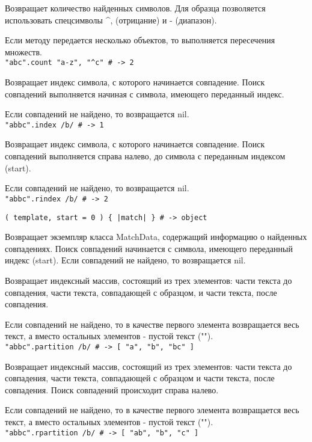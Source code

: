\begin{methodlist}
  Возвращает количество найденных символов. Для образца позволяется использовать спецсимволы \textasciicircum\-, (отрицание) и - (диапазон). 

  Если методу передается несколько объектов, то выполняется пересечения множеств.
  \\\verb!"abc".count "a-z", "^c" # -> 2!

  Возвращает индекс символа, с которого начинается совпадение. Поиск совпадений выполняется начиная с символа, имеющего переданный индекс.

  Если совпадений не найдено, то возвращается nil.
  \\\verb!"abbc".index /b/ # -> 1!

  Возвращает индекс символа, с которого начинается совпадение. Поиск совпадений выполняется справа налево, до символа с переданным индексом (start).

  Если совпадений не найдено, то возвращается nil.
  \\\verb!"abbc".rindex /b/ # -> 2!

  \verb!( template, start = 0 ) { |match| } # -> object!

  Возвращает экземпляр класса MatchData, содержащий информацию о найденных совпадениях. Поиск совпадений начинается с символа, имеющего переданный индекс (start). Если совпадений не найдено, то возвращается nil.

  Возвращает индексный массив, состоящий из трех элементов: части текста до совпадения, части текста, совпадающей с образцом, и части текста, после совпадения.

  Если совпадений не найдено, то в качестве первого элемента возвращается весь текст, а вместо остальных элементов - пустой текст ("").
  \\\verb!"abbc".partition /b/ # -> [ "a", "b", "bc" ]!

  Возвращает индексный массив, состоящий из трех элементов: части текста до совпадения, части текста, совпадающей с образцом и части текста, после совпадения. Поиск совпадений происходит справа налево.

  Если совпадений не найдено, то в качестве первого элемента возвращается весь текст, а вместо остальных элементов - пустой текст ("").
  \\\verb!"abbc".rpartition /b/ # -> [ "ab", "b", "c" ]!


\end{methodlist}
